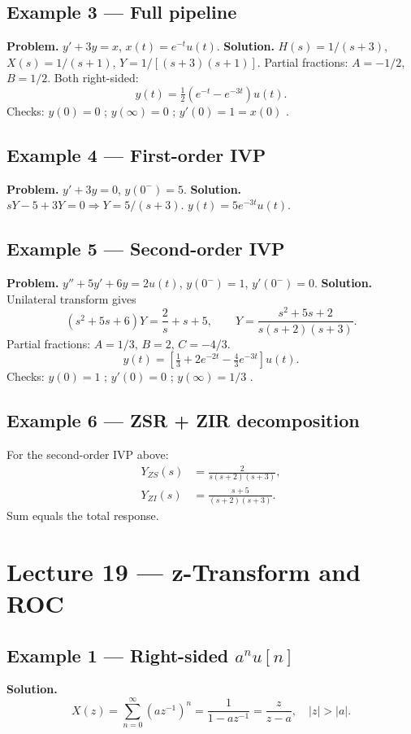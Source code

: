 \documentclass[11pt]{article}
\begin{document}
\subsection{Example 3 --- Full pipeline}
\textbf{Problem.} $y'+3y=x$, $x(t)=e^{-t}u(t)$.
\textbf{Solution.} $H(s)=1/(s+3)$, $X(s)=1/(s+1)$, $Y=1/[(s+3)(s+1)]$. Partial fractions: $A=-1/2$, $B=1/2$. Both right-sided:
\[y(t)=\tfrac{1}{2}(e^{-t}-e^{-3t})u(t).\]
Checks: $y(0)=0$ \checkmark; $y(\infty)=0$ \checkmark; $y'(0)=1=x(0)$ \checkmark.

\subsection{Example 4 --- First-order IVP}
\textbf{Problem.} $y'+3y=0$, $y(0^-)=5$.
\textbf{Solution.} $sY-5+3Y=0\Rightarrow Y=5/(s+3)$. $y(t)=5e^{-3t}u(t)$.

\subsection{Example 5 --- Second-order IVP}
\textbf{Problem.} $y''+5y'+6y=2u(t)$, $y(0^-)=1$, $y'(0^-)=0$.
\textbf{Solution.} Unilateral transform gives
\[(s^2+5s+6)Y=\frac{2}{s}+s+5,\qquad Y=\frac{s^2+5s+2}{s(s+2)(s+3)}.\]
Partial fractions: $A=1/3$, $B=2$, $C=-4/3$.
\[y(t)=\left[\tfrac{1}{3}+2e^{-2t}-\tfrac{4}{3}e^{-3t}\right]u(t).\]
Checks: $y(0)=1$ \checkmark; $y'(0)=0$ \checkmark; $y(\infty)=1/3$ \checkmark.

\subsection{Example 6 --- ZSR + ZIR decomposition}
For the second-order IVP above:
\begin{align*}
Y_{ZS}(s)&=\frac{2}{s(s+2)(s+3)},\\
Y_{ZI}(s)&=\frac{s+5}{(s+2)(s+3)}.
\end{align*}
Sum equals the total response.

\section{Lecture 19 --- z-Transform and ROC}

\subsection{Example 1 --- Right-sided $a^n u[n]$}
\textbf{Solution.}
\[X(z)=\sum_{n=0}^{\infty}(az^{-1})^n=\frac{1}{1-az^{-1}}=\frac{z}{z-a},\quad|z|>|a|.\]
\end{document}
